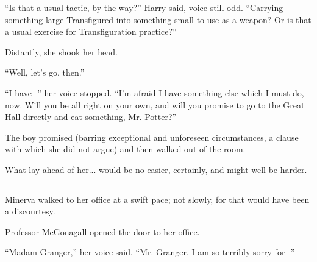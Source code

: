 ``Is that a usual tactic, by the way?'' Harry said, voice still odd.
``Carrying something large Transfigured into something small to use as a
weapon? Or is that a usual exercise for Transfiguration practice?''

Distantly, she shook her head.

``Well, let's go, then.''

``I have -'' her voice stopped. ``I'm afraid I have something else which
I must do, now. Will you be all right on your own, and will you promise
to go to the Great Hall directly and eat something, Mr. Potter?''

The boy promised (barring exceptional and unforeseen circumstances, a
clause with which she did not argue) and then walked out of the room.

What lay ahead of her... would be no easier, certainly, and might
well be harder.

\begin{center}\rule{3in}{0.4pt}\end{center}

Minerva walked to her office at a swift pace; not slowly, for that would
have been a discourtesy.

Professor McGonagall opened the door to her office.

``Madam Granger,'' her voice said, ``Mr. Granger, I am so terribly sorry
for -''
